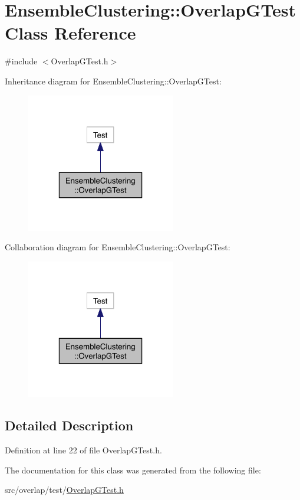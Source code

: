 \hypertarget{class_ensemble_clustering_1_1_overlap_g_test}{\section{Ensemble\-Clustering\-:\-:Overlap\-G\-Test Class Reference}
\label{class_ensemble_clustering_1_1_overlap_g_test}
}


{\ttfamily \#include $<$Overlap\-G\-Test.\-h$>$}



Inheritance diagram for Ensemble\-Clustering\-:\-:Overlap\-G\-Test\-:
\nopagebreak
\begin{figure}[H]
\begin{center}
\leavevmode
\includegraphics[width=184pt]{class_ensemble_clustering_1_1_overlap_g_test__inherit__graph}
\end{center}
\end{figure}


Collaboration diagram for Ensemble\-Clustering\-:\-:Overlap\-G\-Test\-:
\nopagebreak
\begin{figure}[H]
\begin{center}
\leavevmode
\includegraphics[width=184pt]{class_ensemble_clustering_1_1_overlap_g_test__coll__graph}
\end{center}
\end{figure}


\subsection{Detailed Description}


Definition at line 22 of file Overlap\-G\-Test.\-h.



The documentation for this class was generated from the following file\-:\begin{DoxyCompactItemize}
\item 
src/overlap/test/\hyperlink{_overlap_g_test_8h}{Overlap\-G\-Test.\-h}\end{DoxyCompactItemize}
